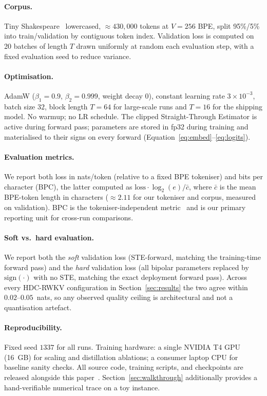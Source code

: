 \documentclass[runningheads]{llncs}
\begin{document}
\paragraph{Corpus.}
Tiny Shakespeare~\cite{karpathy2015tinyshakespeare} lowercased,
${\approx}430{,}000$ tokens at $V{=}256$ BPE, split 95\%/5\% into
train/validation by contiguous token index. Validation loss is computed
on 20 batches of length $T$ drawn uniformly at random each evaluation
step, with a fixed evaluation seed to reduce variance.

\paragraph{Optimisation.}
AdamW ($\beta_1{=}0.9$, $\beta_2{=}0.999$, weight decay $0$), constant
learning rate $3\times 10^{-3}$, batch size $32$, block length $T{=}64$
for large-scale runs and $T{=}16$ for the shipping model. No
warmup; no LR schedule. The clipped Straight-Through Estimator is
active during forward pass; parameters are stored in fp32 during
training and materialised to their signs on every forward
(Equation~\ref{eq:embed}--\ref{eq:logits}).

\paragraph{Evaluation metrics.}
We report both loss in nats/token (relative to a fixed BPE tokeniser)
and bits per character (BPC), the latter computed as
$\text{loss} \cdot \log_2(e) / \bar{c}$, where $\bar{c}$ is the mean
BPE-token length in characters (${\approx}2.11$ for our tokeniser and
corpus, measured on validation). BPC is the tokeniser-independent
metric~\cite{peng2023rwkv} and is our primary reporting unit for
cross-run comparisons.

\paragraph{Soft vs.\ hard evaluation.}
We report both the \emph{soft} validation loss (STE-forward, matching
the training-time forward pass) and the \emph{hard} validation loss
(all bipolar parameters replaced by $\mathrm{sign}(\cdot)$ with no
STE, matching the exact deployment forward pass). Across every
HDC-RWKV configuration in Section~\ref{sec:results} the two agree
within $0.02$--$0.05$~nats, so any observed quality ceiling is
architectural and not a quantisation artefact.

\paragraph{Reproducibility.}
Fixed seed $1337$ for all runs. Training hardware: a single NVIDIA T4
GPU (16~GB) for scaling and distillation ablations; a consumer laptop
CPU for baseline sanity checks. All source code, training scripts, and
checkpoints are released alongside this paper~\cite{wozformer2026}.
Section~\ref{sec:walkthrough} additionally provides a hand-verifiable
numerical trace on a toy instance.
\end{document}
